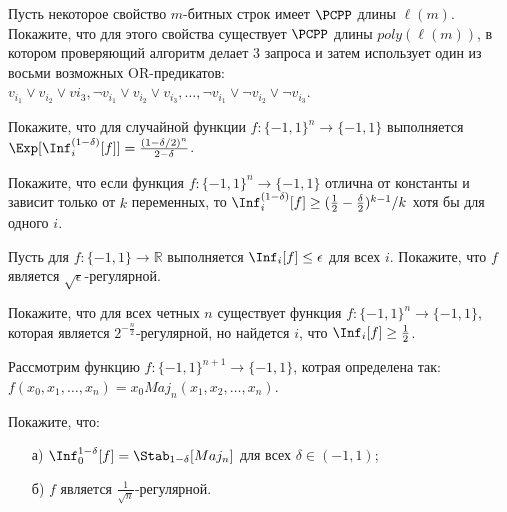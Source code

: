 

\begin{task}
    Пусть некоторое свойство $m$-битных строк имеет $\PCPP$ длины $\ell(m)$. Покажите, что для этого свойства существует $\PCPP$
    длины $poly(\ell(m))$, в котором проверяющий алгоритм делает 3 запроса и затем использует один из восьми возможных
    OR-предикатов: $v_{i_1} \lor v_{i_2} \lor v{i_3}, \lnot v_{i_1} \lor v_{i_2} \lor v_{i_3}, \dots, \lnot v_{i_1} \lor \lnot
    v_{i_2} \lor \lnot v_{i_3}$.
\end{task}

\begin{task}
    Покажите, что для случайной функции $f: \{-1, 1\}^n \to \{-1, 1\}$ выполняется $\Exp[\Inf_i^{(1 - \delta)}[f]] =
    \frac{(1 - \delta / 2)^n}{2 - \delta}$.
\end{task}

\begin{task}
    Покажите, что если функция $f:\{-1, 1\}^n \to \{-1, 1\}$ отлична от константы и зависит только от $k$ переменных, то
    $\Inf_i^{(1 - \delta)}[f] \ge (\frac{1}{2} - \frac{\delta}{2})^{k - 1} / k$ хотя бы для одного $i$.
\end{task}

\begin{task}
    Пусть для $f: \{-1, 1\} \to \mathbb{R}$ выполняется $\Inf_i[f] \le \epsilon$ для всех $i$. Покажите, что $f$ является
    $\sqrt{\epsilon}$-регулярной.
\end{task}

\begin{task}
    Покажите, что для всех четных $n$ существует функция $f: \{-1, 1\}^n \to \{-1, 1\}$, которая является
    $2^{-\frac{n}{2}}$-регулярной, но найдется $i$, что $\Inf_i[f] \ge \frac{1}{2}$.
\end{task}

\begin{task}
    Рассмотрим функцию $f: \{-1, 1\}^{n + 1} \to \{-1, 1\}$, котрая определена так: $f(x_0, x_1, \dots, x_n) = x_0 Maj_n(x_1, x_2,
    \dots, x_n)$.

    Покажите, что:
    \begin{enumerate}[topsep = 0pt, itemsep = -1ex]
        \item [а)] $\Inf_0^{1 - \delta} [f] = \Stab_{1 - \delta}[Maj_n]$ для всех $\delta \in (-1, 1)$;
		\item [б)] $f$ является $\frac{1}{\sqrt{n}}$-регулярной.
	\end{enumerate}
\end{task}


